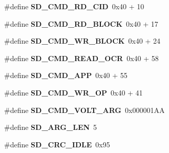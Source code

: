 \begin{DoxyCompactItemize}
\item 
\hypertarget{group__sd__private_ga30323470b548d8be1a691a8eeaba9540}{\#define {\bfseries \-S\-D\-\_\-\-C\-M\-D\-\_\-\-R\-D\-\_\-\-C\-I\-D}~0x40 + 10}\label{group__sd__private_ga30323470b548d8be1a691a8eeaba9540}

\item 
\hypertarget{group__sd__private_ga392c361c24a3b0d90527423aab581941}{\#define {\bfseries \-S\-D\-\_\-\-C\-M\-D\-\_\-\-R\-D\-\_\-\-B\-L\-O\-C\-K}~0x40 + 17}\label{group__sd__private_ga392c361c24a3b0d90527423aab581941}

\item 
\hypertarget{group__sd__private_ga3dca49411f38b777836d181afef3c7d2}{\#define {\bfseries \-S\-D\-\_\-\-C\-M\-D\-\_\-\-W\-R\-\_\-\-B\-L\-O\-C\-K}~0x40 + 24}\label{group__sd__private_ga3dca49411f38b777836d181afef3c7d2}

\item 
\hypertarget{group__sd__private_gae89c9c29627c7ee6312d70934e77720f}{\#define {\bfseries \-S\-D\-\_\-\-C\-M\-D\-\_\-\-R\-E\-A\-D\-\_\-\-O\-C\-R}~0x40 + 58}\label{group__sd__private_gae89c9c29627c7ee6312d70934e77720f}

\item 
\hypertarget{group__sd__private_ga49ba01093cd54b75f2157f82e46e42bf}{\#define {\bfseries \-S\-D\-\_\-\-C\-M\-D\-\_\-\-A\-P\-P}~0x40 + 55}\label{group__sd__private_ga49ba01093cd54b75f2157f82e46e42bf}

\item 
\hypertarget{group__sd__private_ga7e770d05bd97923b7fcb9751dd7d9e30}{\#define {\bfseries \-S\-D\-\_\-\-C\-M\-D\-\_\-\-W\-R\-\_\-\-O\-P}~0x40 + 41}\label{group__sd__private_ga7e770d05bd97923b7fcb9751dd7d9e30}

\item 
\hypertarget{group__sd__private_ga8c8c04b660abe4e970e0010239e9886d}{\#define {\bfseries \-S\-D\-\_\-\-C\-M\-D\-\_\-\-V\-O\-L\-T\-\_\-\-A\-R\-G}~0x000001\-A\-A}\label{group__sd__private_ga8c8c04b660abe4e970e0010239e9886d}

\item 
\hypertarget{group__sd__private_ga882577f65fba8be8398d008645dee177}{\#define {\bfseries \-S\-D\-\_\-\-A\-R\-G\-\_\-\-L\-E\-N}~5}\label{group__sd__private_ga882577f65fba8be8398d008645dee177}

\item 
\hypertarget{group__sd__private_ga9e24faeb7af1aab7941dbd0eedcb670a}{\#define {\bfseries \-S\-D\-\_\-\-C\-R\-C\-\_\-\-I\-D\-L\-E}~0x95}\label{group__sd__private_ga9e24faeb7af1aab7941dbd0eedcb670a}


\end{DoxyCompactItemize}
